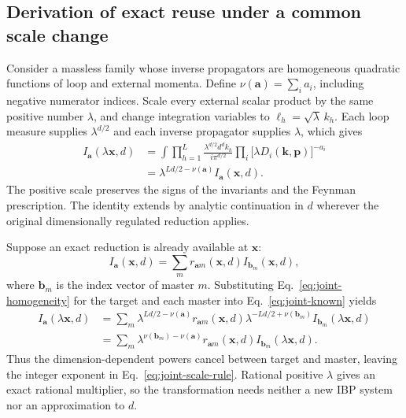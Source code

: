 \subsection{Derivation of exact reuse under a common scale change}
Consider a massless family whose inverse propagators are homogeneous quadratic functions of loop and external momenta. Define $\nu(\boldsymbol a)=\sum_i a_i$, including negative numerator indices. Scale every external scalar product by the same positive number $\lambda$, and change integration variables to $\ell_h=\sqrt{\lambda}\,k_h$. Each loop measure supplies $\lambda^{d/2}$ and each inverse propagator supplies $\lambda$, which gives
\begin{align}
 I_{\boldsymbol a}(\lambda\boldsymbol x,d)
 &=\int\prod_{h=1}^{L}\frac{\lambda^{d/2}d^dk_h}{i\pi^{d/2}}
       \prod_i\bigl[\lambda D_i(\boldsymbol k,\boldsymbol p)\bigr]^{-a_i}
 \nonumber\\
 &=\lambda^{Ld/2-\nu(\boldsymbol a)}I_{\boldsymbol a}(\boldsymbol x,d).
 \label{eq:joint-homogeneity}
\end{align}
The positive scale preserves the signs of the invariants and the Feynman prescription. The identity extends by analytic continuation in $d$ wherever the original dimensionally regulated reduction applies.

Suppose an exact reduction is already available at $\boldsymbol x$:
\begin{equation}
 I_{\boldsymbol a}(\boldsymbol x,d)
 =\sum_m r_{\boldsymbol a m}(\boldsymbol x,d)
   I_{\boldsymbol b_m}(\boldsymbol x,d),
 \label{eq:joint-known}
\end{equation}
where $\boldsymbol b_m$ is the index vector of master $m$. Substituting Eq.~\eqref{eq:joint-homogeneity} for the target and each master into Eq.~\eqref{eq:joint-known} yields
\begin{align}
 I_{\boldsymbol a}(\lambda\boldsymbol x,d)
 &=\sum_m\lambda^{Ld/2-\nu(\boldsymbol a)}
       r_{\boldsymbol a m}(\boldsymbol x,d)
       \lambda^{-Ld/2+\nu(\boldsymbol b_m)}
       I_{\boldsymbol b_m}(\lambda\boldsymbol x,d)
 \nonumber\\
 &=\sum_m\lambda^{\nu(\boldsymbol b_m)-\nu(\boldsymbol a)}
       r_{\boldsymbol a m}(\boldsymbol x,d)
       I_{\boldsymbol b_m}(\lambda\boldsymbol x,d).
 \label{eq:joint-scale-derivation}
\end{align}
Thus the dimension-dependent powers cancel between target and master, leaving the integer exponent in Eq.~\eqref{eq:joint-scale-rule}. Rational positive $\lambda$ gives an exact rational multiplier, so the transformation needs neither a new IBP system nor an approximation to $d$.

